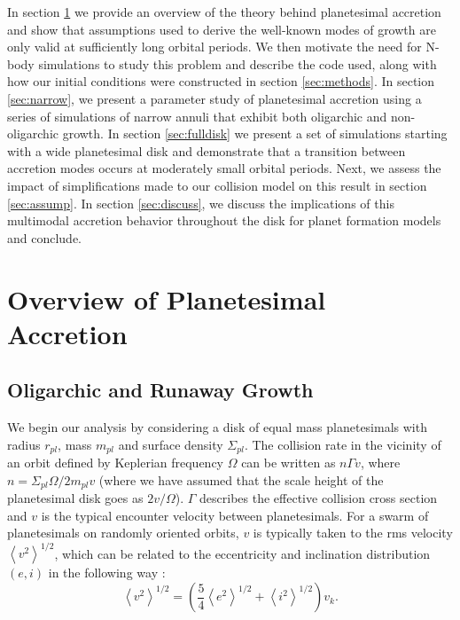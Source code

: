 \documentclass[twocolumn,linenumbers]{aastex63}
\begin{document}
In section \ref{sec:theory} we provide an overview of the theory
behind planetesimal accretion and show that assumptions used to derive
the well-known modes of growth are only valid at sufficiently long
orbital periods. We then motivate the need for N-body simulations to
study this problem and describe the code used, along with how our
initial conditions were constructed in section \ref{sec:methods}. In
section \ref{sec:narrow}, we present a parameter study of planetesimal
accretion using a series of simulations of narrow annuli that exhibit both oligarchic and non-oligarchic growth. In section 
\ref{sec:fulldisk} we present a set of simulations starting with a  wide planetesimal disk and demonstrate that a transition 
between accretion modes occurs at moderately small orbital periods. Next, we assess the impact of 
simplifications made to our collision model on this result in section \ref{sec:assump}. In section \ref{sec:discuss}, we discuss the 
implications of this multimodal accretion behavior throughout the disk for planet formation models and conclude.

\section{Overview of Planetesimal Accretion}\label{sec:theory}

\subsection{Oligarchic and Runaway Growth}

We begin our analysis by considering a disk of equal mass planetesimals
with radius $r_{pl}$, mass $m_{pl}$ and surface density
$\Sigma_{pl}$. The collision rate in the vicinity of an orbit defined
by Keplerian frequency $\Omega$ can be written as $n \Gamma v$, where
$n = \Sigma_{pl} \Omega / 2 m_{pl} v$ (where we have assumed that the scale height of the planetesimal disk goes as $2v/\Omega$). $\Gamma$ describes the effective
collision cross section and $v$ is the typical encounter velocity
between planetesimals.
For a swarm of planetesimals on randomly oriented orbits, $v$ is typically
taken to the rms velocity $\left< v^{2} \right>^{1/2}$, which can be related to the eccentricity and inclination distribution $(e, i)$ in the following way \citep{lissauer93}:
\begin{equation}\label{eq:ecc_vel}
	\left< v^{2} \right>^{1/2} = \left( \frac{5}{4} \left< e^{2} \right>^{1/2} + \left< i^{2} \right>^{1/2}  \right) v_{k}.
\end{equation}
\end{document}
